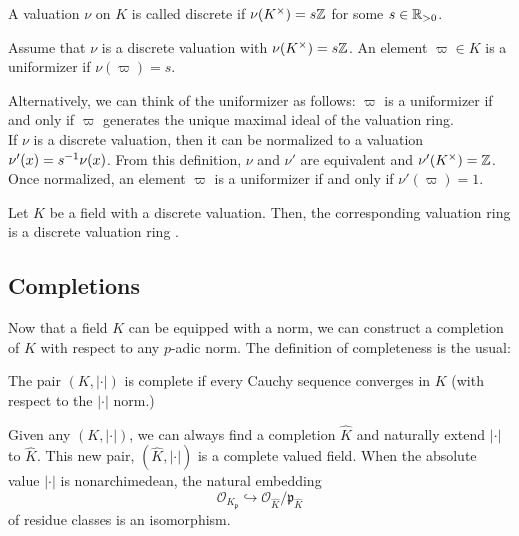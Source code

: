 \begin{definition}

    A valuation $\nu$ on $K$ is called discrete if $\nu(K^\times) = s\mathbb{Z}$ for some $s \in \mathbb{R}_{>0}$.
\end{definition}

\begin{definition}[Uniformizer]
    Assume that $\nu$ is a discrete valuation with $\nu(K^\times) = s\mathbb{Z}$. An element $\varpi \in K$ is a uniformizer if $\nu(\varpi) = s$.
\end{definition}

Alternatively, we can think of the uniformizer as follows: $\varpi$ is a uniformizer if and only if $\varpi$ generates the unique maximal ideal of the valuation ring.\\

If $\nu$ is a discrete valuation, then it can be normalized to a valuation $\nu'(x) = s^{-1} \nu(x)$.  From this definition, $\nu$ and $\nu'$ are equivalent and $\nu'(K^\times) = \mathbb{Z}$. Once normalized, an element $\varpi$ is a uniformizer if and only if $\nu'(\varpi) = 1$.

\begin{proposition}
    Let $K$ be a field with a discrete valuation. Then, the corresponding valuation ring is a discrete valuation ring .
\end{proposition}

\subsection{Completions}

Now that a field $K$ can be equipped with a norm, we can construct a completion of $K$ with respect to any $p$-adic norm. The definition of completeness is the usual:

\begin{definition}[Complete]
    The pair $(K, |\cdot|)$ is complete if every Cauchy sequence converges in $K$ (with respect to the $|\cdot|$ norm.)
\end{definition}

Given any $(K, |\cdot|)$, we can always find a completion $\hat{K}$ and naturally extend $|\cdot|$ to $\hat{K}$. This new pair, $(\hat{K}, |\cdot|)$ is a complete valued field. When the absolute value $|\cdot|$ is nonarchimedean, the natural embedding
    \[\mathcal{O}_{K}_\mathfrak{p} \hookrightarrow \mathcal{O}_{\hat{K}}/\mathfrak{p}_{\hat{K}}\]
of residue classes is an isomorphism.

